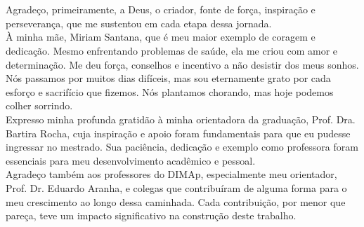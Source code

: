 \chapter*{\agradecimentosnome}

Agradeço, primeiramente, a Deus, o criador, fonte de força, inspiração e perseverança, que me sustentou em cada etapa dessa jornada. \\

À minha mãe, Miriam Santana, que é meu maior exemplo de coragem e dedicação. Mesmo enfrentando problemas de saúde, ela me criou com amor e determinação. Me deu força, conselhos e incentivo a não desistir dos meus sonhos. Nós passamos por muitos dias difíceis, mas sou eternamente grato por cada esforço e sacrifício que fizemos. Nós plantamos chorando, mas hoje podemos colher sorrindo. \\

Expresso minha profunda gratidão à minha orientadora da graduação, Prof. Dra. Bartira Rocha, cuja inspiração e apoio foram fundamentais para que eu pudesse ingressar no mestrado. Sua paciência, dedicação e exemplo como professora foram essenciais para meu desenvolvimento acadêmico e pessoal. \\

Agradeço também aos professores do DIMAp, especialmente meu orientador, Prof. Dr. Eduardo Aranha, e colegas que contribuíram de alguma forma para o meu crescimento ao longo dessa caminhada. Cada contribuição, por menor que pareça, teve um impacto significativo na construção deste trabalho. \\

  \newpage